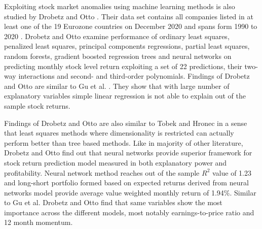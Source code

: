 \documentclass{article}
\begin{document}

Exploiting stock market anomalies using machine learning methods is also studied by Drobetz and Otto \citeyear{Drobetz}. Their data set contains all companies listed in at least one of the 19 Eurozone countries on December 2020 and spans form 1990 to 2020 \footnotemark. Drobetz and Otto examine performance of ordinary least squares, penalized least squares, principal components regressions, partial least squares, random forests, gradient boosted regression trees and neural networks on predicting monthly stock level return exploiting a set of 22 predictions, their two-way interactions and second- and third-order polynomials. Findings of Drobetz and Otto are similar to Gu et al. \citeyear{guetal}. They show that with large number of explanatory variables simple linear regression is not able to explain out of the sample stock returns. \par


Findings of Drobetz and Otto \citeyear{Drobetz} are also similar to Tobek and Hronec \citeyear{TOBEK2021100588} in a sense that least squares methods where dimensionality is restricted can actually perform better than tree based methods. Like in majority of other literature, Drobetz and Otto find out that neural networks provide superior framework for stock return prediction model measured in both explanatory power and profitability. Neural network method reaches out of the sample $R^{2}$ value of 1.23 and long-short portfolio formed based on expected returns derived from neural networks model provide average value weighted monthly return of 1.94\%. Similar to Gu et al. \citeyear{guetal} Drobetz and Otto find that same variables show the most importance across the different models, most notably earnings-to-price ratio and 12 month momentum. \par
\end{document}
